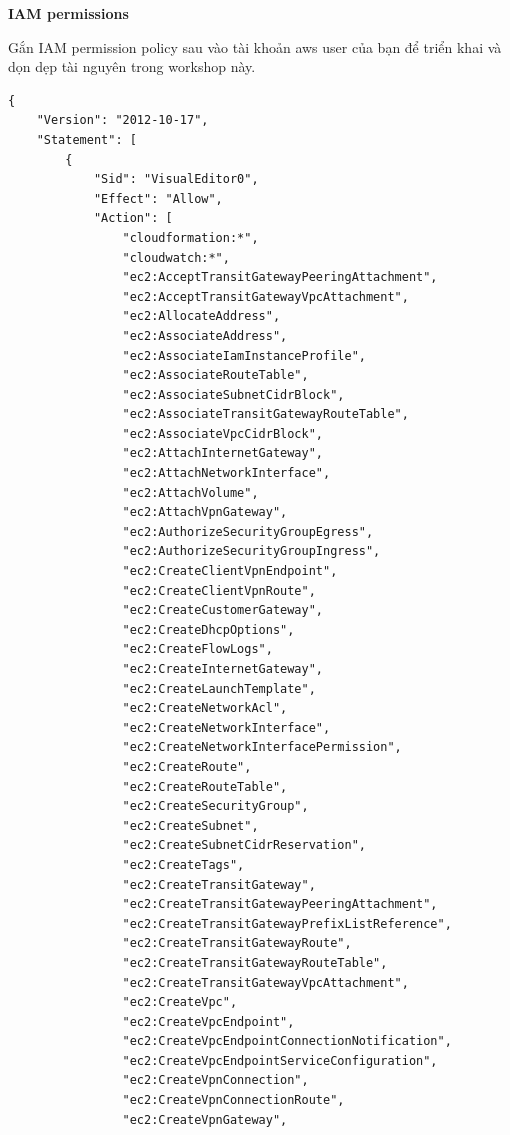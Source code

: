 \vspace{0.5em}\noindent\textbf{IAM permissions}

Gắn IAM permission policy sau vào tài khoản aws user của bạn để triển
khai và dọn dẹp tài nguyên trong workshop này.

\begin{verbatim}
{
    "Version": "2012-10-17",
    "Statement": [
        {
            "Sid": "VisualEditor0",
            "Effect": "Allow",
            "Action": [
                "cloudformation:*",
                "cloudwatch:*",
                "ec2:AcceptTransitGatewayPeeringAttachment",
                "ec2:AcceptTransitGatewayVpcAttachment",
                "ec2:AllocateAddress",
                "ec2:AssociateAddress",
                "ec2:AssociateIamInstanceProfile",
                "ec2:AssociateRouteTable",
                "ec2:AssociateSubnetCidrBlock",
                "ec2:AssociateTransitGatewayRouteTable",
                "ec2:AssociateVpcCidrBlock",
                "ec2:AttachInternetGateway",
                "ec2:AttachNetworkInterface",
                "ec2:AttachVolume",
                "ec2:AttachVpnGateway",
                "ec2:AuthorizeSecurityGroupEgress",
                "ec2:AuthorizeSecurityGroupIngress",
                "ec2:CreateClientVpnEndpoint",
                "ec2:CreateClientVpnRoute",
                "ec2:CreateCustomerGateway",
                "ec2:CreateDhcpOptions",
                "ec2:CreateFlowLogs",
                "ec2:CreateInternetGateway",
                "ec2:CreateLaunchTemplate",
                "ec2:CreateNetworkAcl",
                "ec2:CreateNetworkInterface",
                "ec2:CreateNetworkInterfacePermission",
                "ec2:CreateRoute",
                "ec2:CreateRouteTable",
                "ec2:CreateSecurityGroup",
                "ec2:CreateSubnet",
                "ec2:CreateSubnetCidrReservation",
                "ec2:CreateTags",
                "ec2:CreateTransitGateway",
                "ec2:CreateTransitGatewayPeeringAttachment",
                "ec2:CreateTransitGatewayPrefixListReference",
                "ec2:CreateTransitGatewayRoute",
                "ec2:CreateTransitGatewayRouteTable",
                "ec2:CreateTransitGatewayVpcAttachment",
                "ec2:CreateVpc",
                "ec2:CreateVpcEndpoint",
                "ec2:CreateVpcEndpointConnectionNotification",
                "ec2:CreateVpcEndpointServiceConfiguration",
                "ec2:CreateVpnConnection",
                "ec2:CreateVpnConnectionRoute",
                "ec2:CreateVpnGateway",

\end{verbatim}
